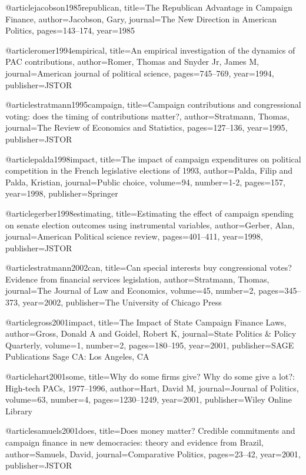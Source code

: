 @article{jacobson1985republican,
  title={The Republican Advantage in Campaign Finance},
  author={Jacobson, Gary},
  journal={The New Direction in American Politics},
  pages={143--174},
  year={1985}
}

@article{romer1994empirical,
  title={An empirical investigation of the dynamics of PAC contributions},
  author={Romer, Thomas and Snyder Jr, James M},
  journal={American journal of political science},
  pages={745--769},
  year={1994},
  publisher={JSTOR}
}

@article{stratmann1995campaign,
  title={Campaign contributions and congressional voting: does the timing of contributions matter?},
  author={Stratmann, Thomas},
  journal={The Review of Economics and Statistics},
  pages={127--136},
  year={1995},
  publisher={JSTOR}
}

@article{palda1998impact,
  title={The impact of campaign expenditures on political competition in the French legislative elections of 1993},
  author={Palda, Filip and Palda, Kristian},
  journal={Public choice},
  volume={94},
  number={1-2},
  pages={157},
  year={1998},
  publisher={Springer}
}

@article{gerber1998estimating,
  title={Estimating the effect of campaign spending on senate election outcomes using instrumental variables},
  author={Gerber, Alan},
  journal={American Political science review},
  pages={401--411},
  year={1998},
  publisher={JSTOR}
}

@article{stratmann2002can,
  title={Can special interests buy congressional votes? Evidence from financial services legislation},
  author={Stratmann, Thomas},
  journal={The Journal of Law and Economics},
  volume={45},
  number={2},
  pages={345--373},
  year={2002},
  publisher={The University of Chicago Press}
}

@article{gross2001impact,
  title={The Impact of State Campaign Finance Laws},
  author={Gross, Donald A and Goidel, Robert K},
  journal={State Politics \& Policy Quarterly},
  volume={1},
  number={2},
  pages={180--195},
  year={2001},
  publisher={SAGE Publications Sage CA: Los Angeles, CA}
}

@article{hart2001some,
  title={Why do some firms give? Why do some give a lot?: High-tech PACs, 1977--1996},
  author={Hart, David M},
  journal={Journal of Politics},
  volume={63},
  number={4},
  pages={1230--1249},
  year={2001},
  publisher={Wiley Online Library}
}

@article{samuels2001does,
  title={Does money matter? Credible commitments and campaign finance in new democracies: theory and evidence from Brazil},
  author={Samuels, David},
  journal={Comparative Politics},
  pages={23--42},
  year={2001},
  publisher={JSTOR}
}

